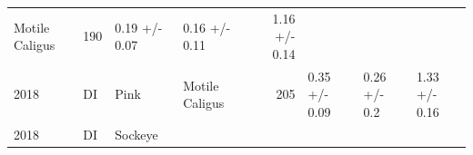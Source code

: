 \documentclass[fleqn,10pt]{wlpeerj} %
\begin{document}
\begin{longtable}[]{@{}llllrlll@{}}
\begin{minipage}[t]{0.11\columnwidth}
Motile Caligus\strut
\end{minipage} & \begin{minipage}[t]{0.04\columnwidth}\raggedleft\strut
190\strut
\end{minipage} & \begin{minipage}[t]{0.14\columnwidth}\raggedright\strut
0.19 +/- 0.07\strut
\end{minipage} & \begin{minipage}[t]{0.14\columnwidth}\raggedright\strut
0.16 +/- 0.11\strut
\end{minipage} & \begin{minipage}[t]{0.14\columnwidth}\raggedright\strut
1.16 +/- 0.14\strut
\end{minipage}\tabularnewline
\begin{minipage}[t]{0.09\columnwidth}\raggedright\strut
2018\strut
\end{minipage} & \begin{minipage}[t]{0.06\columnwidth}\raggedright\strut
DI\strut
\end{minipage} & \begin{minipage}[t]{0.06\columnwidth}\raggedright\strut
Pink\strut
\end{minipage} & \begin{minipage}[t]{0.11\columnwidth}\raggedright\strut
Motile Caligus\strut
\end{minipage} & \begin{minipage}[t]{0.04\columnwidth}\raggedleft\strut
205\strut
\end{minipage} & \begin{minipage}[t]{0.14\columnwidth}\raggedright\strut
0.35 +/- 0.09\strut
\end{minipage} & \begin{minipage}[t]{0.14\columnwidth}\raggedright\strut
0.26 +/- 0.2\strut
\end{minipage} & \begin{minipage}[t]{0.14\columnwidth}\raggedright\strut
1.33 +/- 0.16\strut
\end{minipage}\tabularnewline
\begin{minipage}[t]{0.09\columnwidth}\raggedright\strut
2018\strut
\end{minipage} & \begin{minipage}[t]{0.06\columnwidth}\raggedright\strut
DI\strut
\end{minipage} & \begin{minipage}[t]{0.06\columnwidth}\raggedright\strut
Sockeye\strut
\end{minipage} & \begin{minipage}[t]{0.11\columnwidth}\raggedright\strut

\end{minipage}
\end{longtable}
\end{document}

